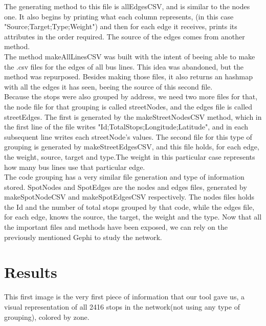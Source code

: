 \documentclass[12pt]{report}
\begin{document}
	The generating method to this file is allEdgesCSV, and is similar to the nodes one.
	It also begins by printing what each column represents, (in this case "Source;Target;Type;Weight") and then for each edge it receives, prints its attributes in the order required. The source of the edges comes from another method.\\
	The method makeAllLinesCSV was built with the intent of beeing able to make the .csv files for the edges of all bus lines. This idea was abandoned, but the method was repurposed. Besides making those files, it also returns an hashmap with all the edges it has seen, beeing the source of this second file.\\
	Because the stops were also grouped by address, we need two more files for that, the node file for that grouping is called streetNodes, and the edges file is called streetEdges. The first is generated by the makeStreetNodesCSV method, which in the first line of the file writes "Id;TotalStops;Longitude;Latitude", and in each subsequent line writes each streetNode's values. The second file for this type of grouping  is generated by makeStreetEdgesCSV, and this file holds, for each edge, the weight, source, target and type.The weight in this particular case represents how many bus lines use that particular edge.\\
	The code grouping has a very similar file generation and type of information stored. SpotNodes and SpotEdges are the nodes and edges files, generated by makeSpotNodeCSV and makeSpotEdgesCSV respectively. The nodes files holds the Id and the number of total stops grouped by that code, while the edges file, for each edge, knows the source, the target, the weight and the type.
	Now that all the important files and methods have been exposed, we can rely on the previously mentioned Gephi to study the network.\\
	
\section{Results}
	This first image is the very first piece of information that our tool gave us, a visual representation of all 2416 stops in the network(not using any type of grouping), colored by zone.\\
\end{document}

